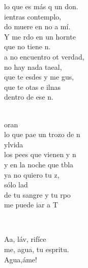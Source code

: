 \documentclass[12pt]{article}
\begin{document}
\begin{multicols*}{2}
\begin{cancion}
	lo que es más q un don.\\
\jump
	ientras  contemplo, \\
	do muere en no a mí.\\
	Y me rdo en un hornte \\
	que no tiene n. \\
\jump
	a no encuentro ot verdad,\\
	 no hay nada taeal,\\
	que te esdes y me gus,\\
	que te otas e ilnas\\
	dentro de ese n.\\\jump\\
	\begin{chorus}%
	oran \\
	lo que pae un trozo de n\\
	ylvida \\
	los pees que vienen y n \\
	y en la noche que tbla \\
	ya no quiero tu z, \\
	sólo lad \\
	de tu sangre y tu rpo  \\
	me puede iar a T\\
	\end{chorus}%
	\jump\\
\end{cancion}%

\begin{cancion}%
	Aa, láv, rifíce\\
	me, agua, tu espritu.\\
	Agua,áme!\\
\end{cancion}%


\end{multicols*}
\end{document}
